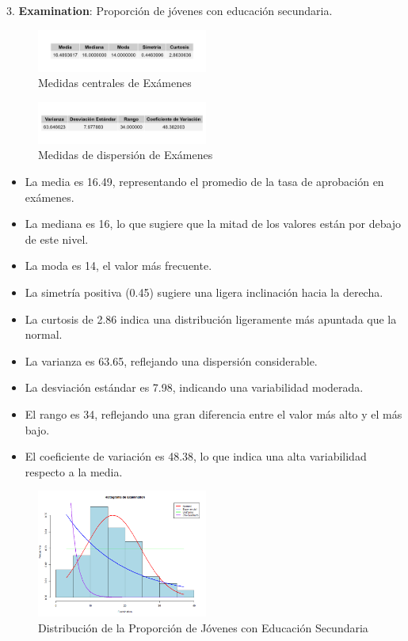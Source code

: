 \documentclass{article}
\begin{document}
   3. \textbf{Examination}: Proporción de jóvenes con educación secundaria.
   \begin{figure}[H]
 \centering
 \includegraphics[width=0.5\textwidth]{Swiss/Examination_central.png}
 \caption{Medidas centrales de Exámenes}
\end{figure}

\begin{figure}[H]
 \centering
 \includegraphics[width=0.5\textwidth]{Swiss/Examination_dispersion.png}
 \caption{Medidas de dispersión de Exámenes}
\end{figure}
   \begin{itemize}
       \item La media es 16.49, representando el promedio de la tasa de aprobación en exámenes.
       \item La mediana es 16, lo que sugiere que la mitad de los valores están por debajo de este nivel.
       \item La moda es 14, el valor más frecuente.
       \item La simetría positiva (0.45) sugiere una ligera inclinación hacia la derecha.
       \item La curtosis de 2.86 indica una distribución ligeramente más apuntada que la normal.
       \item La varianza es 63.65, reflejando una dispersión considerable.
       \item La desviación estándar es 7.98, indicando una variabilidad moderada.
       \item El rango es 34, reflejando una gran diferencia entre el valor más alto y el más bajo.
       \item El coeficiente de variación es 48.38, lo que indica una alta variabilidad respecto a la media.
   \end{itemize}

   \begin{figure}[H]
    \centering
    \includegraphics[width=0.5\textwidth]{Histogramas/histogram_examination.png}
    \caption{Distribución de la Proporción de Jóvenes con Educación Secundaria}
    \end{figure}
\end{document}
